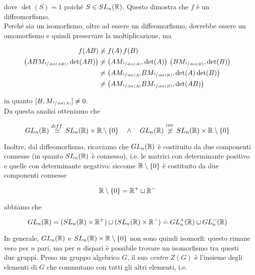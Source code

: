 dove $ \det(S) = 1 $ poiché $ S \in SL_{n} (\mathbb{R}) $. Questo dimostra che $ f $ è un diffeomorfismo.\\
Perché sia un isomorfismo, oltre ad essere un diffeomorfismo, dovrebbe essere un omomorfismo e quindi preservare la moltiplicazione, ma

\begin{align}
	\begin{split}
		f(A B) &\neq f(A) \, f(B)\\
		\left( A B M_{\sfrac{1}{\det(A B)}}, \det(A B) \right) &\neq \left( A M_{\sfrac{1}{\det(A)}},\det(A) \right) \, \left( B M_{\sfrac{1}{\det(B)}},\det(B) \right)\\
		&\neq \left( A M_{\sfrac{1}{\det(A)}} B M_{\sfrac{1}{\det(B)}},\det(A) \det(B) \right)\\
		&\neq \left( A M_{\sfrac{1}{\det(A)}} B M_{\sfrac{1}{\det(B)}},\det(A B) \right)
	\end{split}
\end{align}

in quanto $ [B, M_{\sfrac{1}{\det(A)}}] \neq 0 $.\\
Da questa analisi otteniamo che

\begin{equation}
	GL_{n}(\mathbb{R}) \stackrel{diff.}{\simeq} SL_{n}(\mathbb{R}) \times \mathbb{R} \setminus \{0\} \quad \wedge \quad GL_{n}(\mathbb{R}) \stackrel{iso.}{\not\simeq} SL_{n}(\mathbb{R}) \times \mathbb{R} \setminus \{0\}
\end{equation}

Inoltre, dal diffeomorfismo, ricaviamo che $ GL_{n}(\mathbb{R}) $ è costituito da due componenti connesse (in quanto $ SL_{n}(\mathbb{R}) $ è connesso), i.e. le matrici con determinante positivo e quelle con determinante negativo: siccome $ \mathbb{R} \setminus \{0\} $ è costituito da due componenti connesse

\begin{equation}
	\mathbb{R} \setminus \{0\} = \mathbb{R}^{+} \sqcup \mathbb{R}^{-}
\end{equation}

abbiamo che

\begin{equation}
	GL_{n}(\mathbb{R}) = (SL_{n}(\mathbb{R}) \times \mathbb{R}^{+}) \sqcup (SL_{n}(\mathbb{R}) \times \mathbb{R}^{-}) \doteq GL_{n}^{+}(\mathbb{R}) \sqcup GL_{n}^{-}(\mathbb{R})
\end{equation}

In generale, $ GL_{n}(\mathbb{R}) $ e $ SL_{n}(\mathbb{R}) \times \mathbb{R} \setminus \{0\} $ non sono quindi isomorfi: questo rimane vero per $ n $ pari, ma per $ n $ dispari è possibile trovare un isomorfismo tra questi due gruppi.
Preso un gruppo algebrico $ G $, il suo \textit{centro} $ Z(G) $ è l'insieme  degli elementi di $ G $ che commutano con tutti gli altri elementi, i.e.

